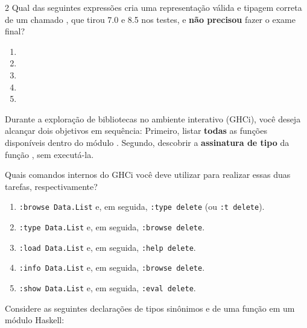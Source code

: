 \documentclass[a4paper,10pt,brazil]{article}
\begin{document}
\begin{multicols}{2}
Qual das seguintes expressões cria uma representação válida e tipagem correta de um  chamado , que tirou 7.0 e 8.5 nos testes, e \textbf{não precisou} fazer o exame final?

\begin{enumerate}
  \item {}

  \item {}

  \item {}

  \item {}

  \item {}


\end{enumerate}

Durante a exploração de bibliotecas no ambiente interativo (GHCi), você deseja alcançar dois objetivos em sequência:
Primeiro, listar \textbf{todas} as funções disponíveis dentro do módulo .
Segundo, descobrir a \textbf{assinatura de tipo} da função , sem executá-la.

Quais comandos internos do GHCi você deve utilizar para realizar essas duas tarefas, respectivamente?

\begin{enumerate}
  \item \texttt{:browse Data.List} e, em seguida, \texttt{:type delete} (ou \texttt{:t delete}).

  \item \texttt{:type Data.List} e, em seguida, \texttt{:browse delete}.

  \item \texttt{:load Data.List} e, em seguida, \texttt{:help delete}.

  \item \texttt{:info Data.List} e, em seguida, \texttt{:browse delete}.

  \item \texttt{:show Data.List} e, em seguida, \texttt{:eval delete}.


\end{enumerate}

Considere as seguintes declarações de tipos sinônimos e de uma função em um módulo Haskell:


\end{multicols}
\end{document}

